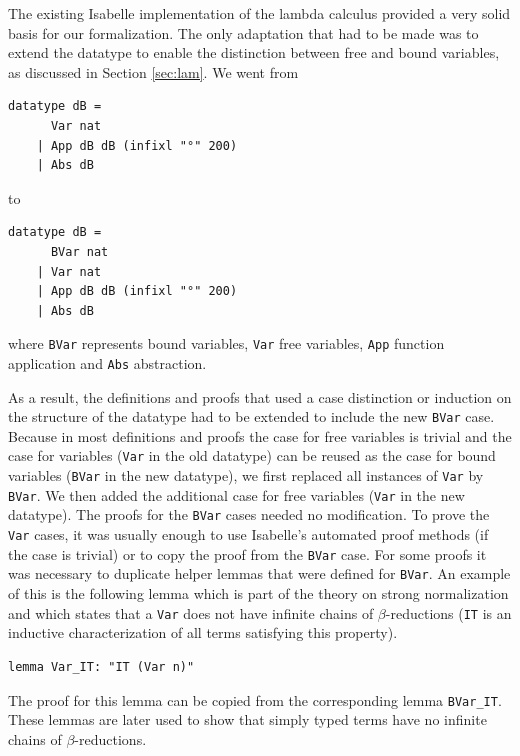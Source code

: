 The existing Isabelle implementation of the lambda calculus provided a very solid basis for our formalization. The only adaptation that had to be made was to extend the datatype to enable the distinction between free and bound variables, as discussed in Section \ref{sec:lam}. We went from

\begin{verbatim}
datatype dB =
	  Var nat
	| App dB dB (infixl "°" 200)
	| Abs dB
\end{verbatim}

to

\begin{verbatim}
datatype dB =
	  BVar nat
	| Var nat
	| App dB dB (infixl "°" 200)
	| Abs dB
\end{verbatim}

where \texttt{BVar} represents bound variables, \texttt{Var} free variables, \texttt{App} function application and \texttt{Abs} abstraction.

As a result, the definitions and proofs that used a case distinction or induction on the structure of the datatype had to be extended to include the new \texttt{BVar} case. Because in most definitions and proofs the case for free variables is trivial and the case for variables (\texttt{Var} in the old datatype) can be reused as the case for bound variables (\texttt{BVar} in the new datatype), we first replaced all instances of \texttt{Var} by \texttt{BVar}. We then added the additional case for free variables (\texttt{Var} in the new datatype). The proofs for the \texttt{BVar} cases needed no modification. To prove the \texttt{Var} cases, it was usually enough to use Isabelle's automated proof methods (if the case is trivial) or to copy the proof from the \texttt{BVar} case. For some proofs it was necessary to duplicate helper lemmas that were defined for \texttt{BVar}. An example of this is the following lemma which is part of the theory on strong normalization and which states that a \texttt{Var} does not have infinite chains of $\beta$-reductions (\texttt{IT} is an inductive characterization of all terms satisfying this property).

\begin{verbatim}
lemma Var_IT: "IT (Var n)"
\end{verbatim}

The proof for this lemma can be copied from the corresponding lemma \texttt{BVar\_IT}. These lemmas are later used to show that simply typed terms have no infinite chains of $\beta$-reductions.

